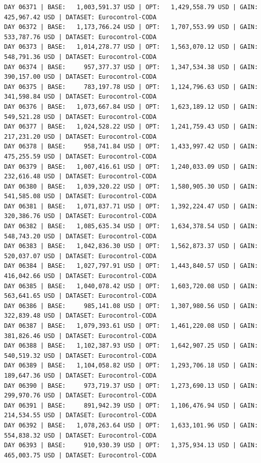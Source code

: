 \documentclass[11pt,a4paper]{article}
\begin{document}
\begin{verbatim}
DAY 06371 | BASE:   1,003,591.37 USD | OPT:   1,429,558.79 USD | GAIN: 425,967.42 USD | DATASET: Eurocontrol-CODA
DAY 06372 | BASE:   1,173,766.24 USD | OPT:   1,707,553.99 USD | GAIN: 533,787.76 USD | DATASET: Eurocontrol-CODA
DAY 06373 | BASE:   1,014,278.77 USD | OPT:   1,563,070.12 USD | GAIN: 548,791.36 USD | DATASET: Eurocontrol-CODA
DAY 06374 | BASE:     957,377.37 USD | OPT:   1,347,534.38 USD | GAIN: 390,157.00 USD | DATASET: Eurocontrol-CODA
DAY 06375 | BASE:     783,197.78 USD | OPT:   1,124,796.63 USD | GAIN: 341,598.84 USD | DATASET: Eurocontrol-CODA
DAY 06376 | BASE:   1,073,667.84 USD | OPT:   1,623,189.12 USD | GAIN: 549,521.28 USD | DATASET: Eurocontrol-CODA
DAY 06377 | BASE:   1,024,528.22 USD | OPT:   1,241,759.43 USD | GAIN: 217,231.20 USD | DATASET: Eurocontrol-CODA
DAY 06378 | BASE:     958,741.84 USD | OPT:   1,433,997.42 USD | GAIN: 475,255.59 USD | DATASET: Eurocontrol-CODA
DAY 06379 | BASE:   1,007,416.61 USD | OPT:   1,240,033.09 USD | GAIN: 232,616.48 USD | DATASET: Eurocontrol-CODA
DAY 06380 | BASE:   1,039,320.22 USD | OPT:   1,580,905.30 USD | GAIN: 541,585.08 USD | DATASET: Eurocontrol-CODA
DAY 06381 | BASE:   1,071,837.71 USD | OPT:   1,392,224.47 USD | GAIN: 320,386.76 USD | DATASET: Eurocontrol-CODA
DAY 06382 | BASE:   1,085,635.34 USD | OPT:   1,634,378.54 USD | GAIN: 548,743.20 USD | DATASET: Eurocontrol-CODA
DAY 06383 | BASE:   1,042,836.30 USD | OPT:   1,562,873.37 USD | GAIN: 520,037.07 USD | DATASET: Eurocontrol-CODA
DAY 06384 | BASE:   1,027,797.91 USD | OPT:   1,443,840.57 USD | GAIN: 416,042.66 USD | DATASET: Eurocontrol-CODA
DAY 06385 | BASE:   1,040,078.42 USD | OPT:   1,603,720.08 USD | GAIN: 563,641.65 USD | DATASET: Eurocontrol-CODA
DAY 06386 | BASE:     985,141.08 USD | OPT:   1,307,980.56 USD | GAIN: 322,839.48 USD | DATASET: Eurocontrol-CODA
DAY 06387 | BASE:   1,079,393.61 USD | OPT:   1,461,220.08 USD | GAIN: 381,826.46 USD | DATASET: Eurocontrol-CODA
DAY 06388 | BASE:   1,102,387.93 USD | OPT:   1,642,907.25 USD | GAIN: 540,519.32 USD | DATASET: Eurocontrol-CODA
DAY 06389 | BASE:   1,104,058.82 USD | OPT:   1,293,706.18 USD | GAIN: 189,647.36 USD | DATASET: Eurocontrol-CODA
DAY 06390 | BASE:     973,719.37 USD | OPT:   1,273,690.13 USD | GAIN: 299,970.76 USD | DATASET: Eurocontrol-CODA
DAY 06391 | BASE:     891,942.39 USD | OPT:   1,106,476.94 USD | GAIN: 214,534.55 USD | DATASET: Eurocontrol-CODA
DAY 06392 | BASE:   1,078,263.64 USD | OPT:   1,633,101.96 USD | GAIN: 554,838.32 USD | DATASET: Eurocontrol-CODA
DAY 06393 | BASE:     910,930.39 USD | OPT:   1,375,934.13 USD | GAIN: 465,003.75 USD | DATASET: Eurocontrol-CODA

\end{verbatim}
\end{document}
